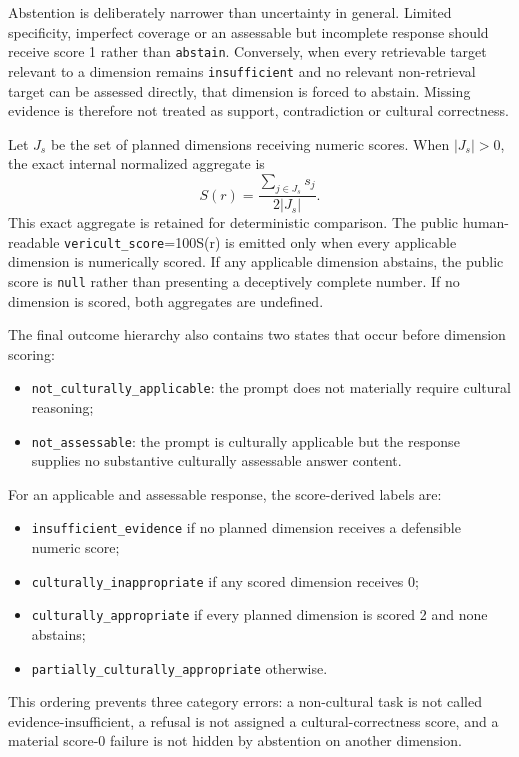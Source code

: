Abstention is deliberately narrower than uncertainty in general. Limited specificity, imperfect coverage or an assessable but incomplete response should receive score 1 rather than \texttt{abstain}. Conversely, when every retrievable target relevant to a dimension remains \texttt{insufficient} and no relevant non-retrieval target can be assessed directly, that dimension is forced to abstain. Missing evidence is therefore not treated as support, contradiction or cultural correctness.

Let $J_s$ be the set of planned dimensions receiving numeric scores. When $|J_s|>0$, the exact internal normalized aggregate is
\[
S(r)=\frac{\sum_{j\in J_s}s_j}{2|J_s|}.
\]
This exact aggregate is retained for deterministic comparison. The public human-readable \texttt{vericult\_score}=100S(r) is emitted only when every applicable dimension is numerically scored. If any applicable dimension abstains, the public score is \texttt{null} rather than presenting a deceptively complete number. If no dimension is scored, both aggregates are undefined.

The final outcome hierarchy also contains two states that occur before dimension scoring:
\begin{itemize}
    \item \texttt{not\_culturally\_applicable}: the prompt does not materially require cultural reasoning;
    \item \texttt{not\_assessable}: the prompt is culturally applicable but the response supplies no substantive culturally assessable answer content.
\end{itemize}

For an applicable and assessable response, the score-derived labels are:
\begin{itemize}
    \item \texttt{insufficient\_evidence} if no planned dimension receives a defensible numeric score;
    \item \texttt{culturally\_inappropriate} if any scored dimension receives 0;
    \item \texttt{culturally\_appropriate} if every planned dimension is scored 2 and none abstains;
    \item \texttt{partially\_culturally\_appropriate} otherwise.
\end{itemize}

This ordering prevents three category errors: a non-cultural task is not called evidence-insufficient, a refusal is not assigned a cultural-correctness score, and a material score-0 failure is not hidden by abstention on another dimension.

